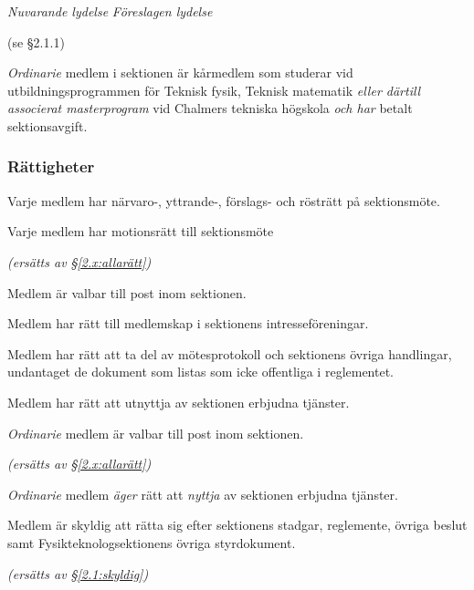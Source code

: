 \documentclass{article}
\newenvironment{lydelse}
    {\begin{paracol}{2}%
        \emph{Nuvarande lydelse}%
        \switchcolumn%
        \emph{Föreslagen lydelse}%
    \end{paracol}%
    \begin{enumerate}[label=\thesubsection.\arabic*]%
    \begin{paracol}{2}%
    }{\end{paracol}\end{enumerate}}
\begin{document}
\begin{lydelse}
    (se \S 2.1.1)

  \switchcolumn
    \item \emph{Ordinarie} medlem i sektionen är kårmedlem som studerar vid utbildningsprogrammen för Teknisk fysik, Teknisk matematik \emph{eller därtill associerat masterprogram} vid Chalmers tekniska högskola \emph{och har} betalt sektionsavgift.

    \subsubsection*{Rättigheter}
  \switchcolumn*
  \setcounter{subsection}{2}
    \item Varje medlem har närvaro-, yttrande-, förslags- och rösträtt på sektionsmöte.
   
    \item Varje medlem har motionsrätt till sektionsmöte
    
  \switchcolumn
    \item[] \emph{(ersätts av \S\ref{2.x:allarätt})} 

  \switchcolumn*

    \item Medlem är valbar till post inom sektionen.

    \item Medlem har rätt till medlemskap i sektionens intresseföreningar.

    \item Medlem har rätt att ta del av mötesprotokoll och sektionens övriga handlingar, undantaget de dokument som listas som icke offentliga i reglementet.
    
    \item Medlem har rätt att utnyttja av sektionen erbjudna tjänster.
    
  \switchcolumn
    
    \item \emph{Ordinarie} medlem är valbar till post inom sektionen.
    
    \item[] \emph{(ersätts av \S\ref{2.x:allarätt})}
    
    \item \emph{Ordinarie} medlem \emph{äger} rätt att \emph{nyttja} av sektionen erbjudna tjänster.
    
    
  \switchcolumn*
  \setcounter{subsection}{3}
  \setcounter{enumi}{0}
    \item Medlem är skyldig att rätta sig efter sektionens stadgar, regle\-mente, övriga beslut samt Fysikteknologsektionens övriga styrdokument.
    
  \switchcolumn
    \emph{(ersätts av \S \ref{2.1:skyldig})}
\end{lydelse}
\end{document}
